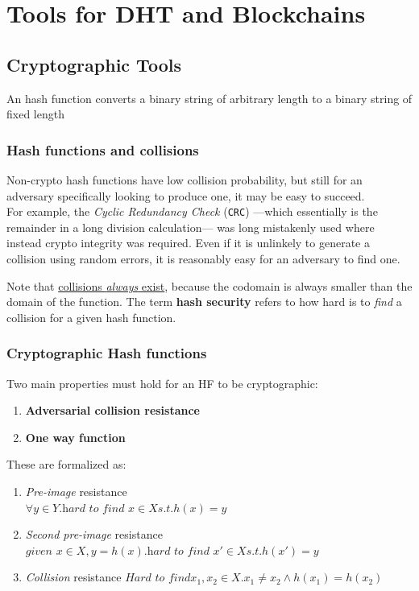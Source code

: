 \chapter{Tools for DHT and Blockchains}
\section{Cryptographic Tools}
\begin{definition}
   An hash function converts a binary string of arbitrary length to a binary string of fixed length
\end{definition}

\subsection{Hash functions and collisions}
Non-crypto hash functions have low collision probability, but still for an adversary specifically looking to produce one, it may be easy to succeed.\\
For example, the \textit{Cyclic Redundancy Check} (\texttt{CRC}) ---which essentially is the remainder in a long division calculation--- was long mistakenly used where instead crypto integrity was required.
Even if it is unlinkely to generate a collision using random errors, it is reasonably easy for an adversary to find one. 

Note that \ul{collisions \textit{always} exist}, because the codomain is always smaller than the domain of the function.
The term \textbf{hash security} refers to how hard is to \textit{find} a collision for a given hash function.


\subsection{Cryptographic Hash functions}
Two main properties must hold for an HF to be cryptographic:
\begin{enumerate}
   \item \textbf{Adversarial collision resistance}
   \item \textbf{One way function}
\end{enumerate}

These are formalized as:
\begin{enumerate}
   \item \textit{Pre-image} resistance\\
   $\forall y \in Y. \textit{hard to find } x \in X s.t. h(x) = y$
   \item \textit{Second pre-image} resistance
   $\textit{given } x \in X, y = h(x). \textit{hard to find } x' \in X s.t. h(x') = y$
   \item \textit{Collision} resistance
   $\textit{Hard to find} x_1,x_2 \in X. x_1 \neq x_2 \wedge h(x_1) = h(x_2)$
\end{enumerate}

